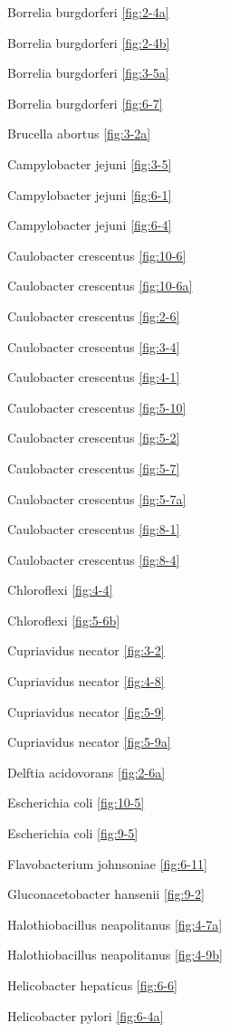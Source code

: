 \documentclass[]{tufte-book}
\begin{document}
Borrelia burgdorferi \ref{fig:2-4a}

Borrelia burgdorferi \ref{fig:2-4b}

Borrelia burgdorferi \ref{fig:3-5a}

Borrelia burgdorferi \ref{fig:6-7}

Brucella abortus \ref{fig:3-2a}

Campylobacter jejuni \ref{fig:3-5}

Campylobacter jejuni \ref{fig:6-1}

Campylobacter jejuni \ref{fig:6-4}

Caulobacter crescentus \ref{fig:10-6}

Caulobacter crescentus \ref{fig:10-6a}

Caulobacter crescentus \ref{fig:2-6}

Caulobacter crescentus \ref{fig:3-4}

Caulobacter crescentus \ref{fig:4-1}

Caulobacter crescentus \ref{fig:5-10}

Caulobacter crescentus \ref{fig:5-2}

Caulobacter crescentus \ref{fig:5-7}

Caulobacter crescentus \ref{fig:5-7a}

Caulobacter crescentus \ref{fig:8-1}

Caulobacter crescentus \ref{fig:8-4}

Chloroflexi \ref{fig:4-4}

Chloroflexi \ref{fig:5-6b}

Cupriavidus necator \ref{fig:3-2}

Cupriavidus necator \ref{fig:4-8}

Cupriavidus necator \ref{fig:5-9}

Cupriavidus necator \ref{fig:5-9a}

Delftia acidovorans \ref{fig:2-6a}

Escherichia coli \ref{fig:10-5}

Escherichia coli \ref{fig:9-5}

Flavobacterium johnsoniae \ref{fig:6-11}

Gluconacetobacter hansenii \ref{fig:9-2}

Halothiobacillus neapolitanus \ref{fig:4-7a}

Halothiobacillus neapolitanus \ref{fig:4-9b}

Helicobacter hepaticus \ref{fig:6-6}

Helicobacter pylori \ref{fig:6-4a}
\end{document}
